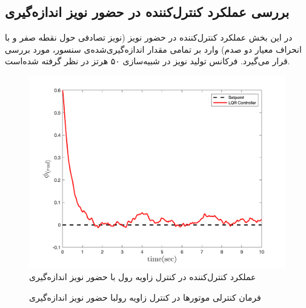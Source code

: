 \subsection{بررسی عملكرد کنترل‌کننده در حضور نويز اندازه‌گیری}\label{roll_noise}

در این بخش عملکرد کنترل‌کننده در حضور نویز (نویز تصادفی حول نقطه صفر و با انحراف معیار دو صدم) وارد بر تمامی مقدار  اندازه‌گیری‌شده‌ی سنسور، مورد بررسی قرار می‌گیرد. فرکانس تولید نویز در شبیه‌سازی ۵۰ هرتز در نظر گرفته شده‌است.
\begin{figure}[H]
	\includegraphics[width=.48\linewidth]{../Figures/MIL/LQR/Roll/lqr_roll.png}
	\centering
	\caption{عملكرد کنترل‌کننده   در کنترل زاويه رول با حضور نويز اندازه‌گیری}
	\label{lqr_roll_figure_simulation_n}
\end{figure}
\begin{figure}[H]
	\centering
	\caption{‫‪فرمان کنترلی موتورها در کنترل زاویه رولبا حضور نويز اندازه‌گیری}
\end{figure}


